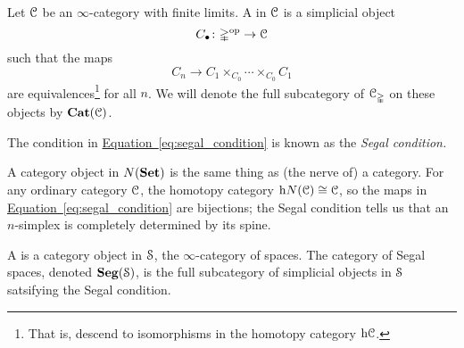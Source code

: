 \documentclass[main.tex]{subfiles}
\begin{document}
%

\begin{definition}
  \label{def:category_object}
  Let $\category{C}$ be an $\infty$-category with finite limits. A  in $\category{C}$ is a simplicial object
  \begin{equation*}
    C_{\bullet}\colon \D\op \to \category{C}
  \end{equation*}
  such that the maps
  \begin{equation}
    \label{eq:segal_condition}
    C_{n} \to C_{1} \times_{C_{0}} \cdots \times_{C_{0}} C_{1}
  \end{equation}
  are equivalences\footnote{That is, descend to isomorphisms in the homotopy category $\h \category{C}$.} for all $n$. We will denote the full subcategory of $\category{C}_{\D}$ on these objects by $\Cat(\category{C})$.
\end{definition}

The condition in \hyperref[eq:segal_condition]{Equation~\ref*{eq:segal_condition}} is known as the \emph{Segal condition.}

\begin{example}
  A category object in $N(\Set)$ is the same thing as (the nerve of) a category. For any ordinary category $\category{C}$, the homotopy category $\h N(\category{C}) \cong \category{C}$, so the maps in \hyperref[eq:segal_condition]{Equation~\ref*{eq:segal_condition}} are bijections; the Segal condition tells us that an $n$-simplex is completely determined by its spine.
\end{example}

\begin{definition}
  \label{def:segal_space}
  A  is a category object in $\category{S}$, the $\infty$-category of spaces. The category of Segal spaces, denoted $\Seg(\S)$, is the full subcategory of simplicial objects in $\S$ satsifying the Segal condition.
\end{definition}
\end{document}
